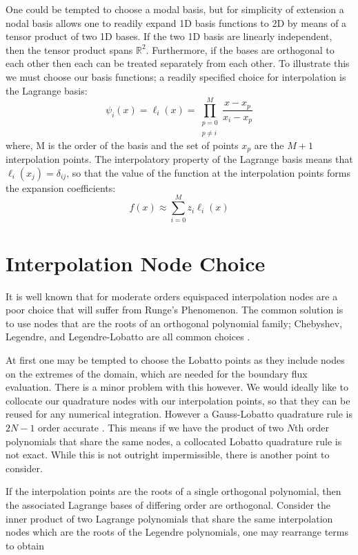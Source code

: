 \documentclass[letterpaper,12pt]{report}
\newcommand{\be}{\begin{equation}}
\newcommand{\ee}{\end{equation}}
\begin{document}
One could be tempted to choose a modal basis, but for simplicity of extension a nodal basis allows one to readily expand 1D basis functions to 2D by means of a tensor product of two 1D bases. If the two 1D basis are linearly independent, then the tensor product spans $\mathbb{R}^2$. Furthermore, if the bases are orthogonal to each other then each can be treated separately from each other. To illustrate this we must choose our basis functions; a readily specified choice for interpolation is the Lagrange basis:
\be \psi_i(x) =\ell_i(x) = \prod_{\substack{p=0\\ p\neq i}}^M \frac{x-x_p}{x_i-x_p}\ee
where, M is the order of the basis and the set of points ${x_p}$ are the $M+1$ interpolation points. The interpolatory property of the Lagrange basis means that $\ell_i(x_j) = \delta_{ij}$, so that the value of the function at the interpolation points forms the expansion coefficients:
\be f(x) \approx \sum_{i=0}^M z_i \ell_i(x) \ee

%
\section{Interpolation Node Choice}
It is well known that for moderate orders equispaced interpolation nodes are a poor choice that will suffer from Runge's Phenomenon. The common solution is to use nodes that are the roots of an orthogonal polynomial family; Chebyshev, Legendre, and Legendre-Lobatto are all common choices \cite{Roni}. 

At first one may be tempted to choose the Lobatto points as they include nodes on the extremes of the domain, which are needed for the boundary flux evaluation. There is a minor problem with this however. We would ideally like to collocate our quadrature nodes with our interpolation points, so that they can be reused for any numerical integration. However a Gauss-Lobatto quadrature rule is $2N-1$ order accurate \cite{Roni}. This means if we have the product of two $N$th order polynomials that share the same nodes, a collocated Lobatto quadrature rule is not exact. While this is not outright impermissible, there is another point to consider.

If the interpolation points are the roots of a single orthogonal polynomial, then the associated Lagrange bases of differing order are orthogonal. Consider the inner product of two Lagrange polynomials that share the same interpolation nodes which are the roots of the Legendre polynomials, one may rearrange terms to obtain
\end{document}
